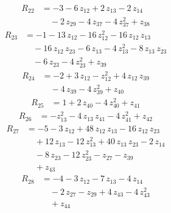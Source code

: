 \begin{equation*}\begin{aligned}
R_{22}&=-3 -6\,z_{12} +2\,z_{13} -2\,z_{14} \\
&\quad -2\,z_{29} -4\,z_{37} -4\,z_{37}^{2} +z_{38}
\end{aligned}\end{equation*}
\begin{equation*}\begin{aligned}
R_{23}&=-1 -13\,z_{12} -16\,z_{12}^{2} -16\,z_{12}\,z_{13} \\
&\quad -16\,z_{12}\,z_{23} -6\,z_{13} -4\,z_{13}^{2} -8\,z_{13}\,z_{23} \\
&\quad -6\,z_{23} -4\,z_{23}^{2} +z_{39}
\end{aligned}\end{equation*}
\begin{equation*}\begin{aligned}
R_{24}&=-2 +3\,z_{12} -z_{12}^{2} +4\,z_{12}\,z_{39} \\
&\quad -4\,z_{39} -4\,z_{39}^{2} +z_{40}
\end{aligned}\end{equation*}
\begin{equation*}\begin{aligned}
R_{25}&=1 +2\,z_{40} -4\,z_{40}^{2} +z_{41}
\end{aligned}\end{equation*}
\begin{equation*}\begin{aligned}
R_{26}&=-z_{13}^{2} -4\,z_{13}\,z_{41} -4\,z_{41}^{2} +z_{42}
\end{aligned}\end{equation*}
\begin{equation*}\begin{aligned}
R_{27}&=-5 -3\,z_{12} +48\,z_{12}\,z_{13} -16\,z_{12}\,z_{23} \\
&\quad +12\,z_{13} -12\,z_{13}^{2} +40\,z_{13}\,z_{23} -2\,z_{14} \\
&\quad -8\,z_{23} -12\,z_{23}^{2} -z_{27} -z_{39} \\
&\quad +z_{43}
\end{aligned}\end{equation*}
\begin{equation*}\begin{aligned}
R_{28}&=-4 -3\,z_{12} -7\,z_{13} -4\,z_{14} \\
&\quad -2\,z_{27} -z_{29} +4\,z_{43} -4\,z_{43}^{2} \\
&\quad +z_{44}
\end{aligned}\end{equation*}
